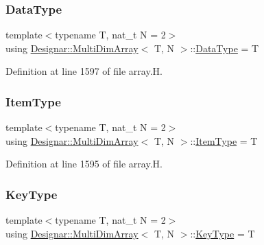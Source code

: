 \subsubsection{\texorpdfstring{Data\+Type}{DataType}}
{\footnotesize\ttfamily template$<$typename T, nat\+\_\+t N = 2$>$ \\
using \hyperlink{class_designar_1_1_multi_dim_array}{Designar\+::\+Multi\+Dim\+Array}$<$ T, N $>$\+::\hyperlink{class_designar_1_1_multi_dim_array_a23b3bec3a6a803d8ef7becceb592d6c0}{Data\+Type} =  T}



Definition at line 1597 of file array.\+H.

\mbox{\label{class_designar_1_1_multi_dim_array_a1b4c346c7e11cbada54447843d0c7880}} 
\subsubsection{\texorpdfstring{Item\+Type}{ItemType}}
{\footnotesize\ttfamily template$<$typename T, nat\+\_\+t N = 2$>$ \\
using \hyperlink{class_designar_1_1_multi_dim_array}{Designar\+::\+Multi\+Dim\+Array}$<$ T, N $>$\+::\hyperlink{class_designar_1_1_multi_dim_array_a1b4c346c7e11cbada54447843d0c7880}{Item\+Type} =  T}



Definition at line 1595 of file array.\+H.

\mbox{\label{class_designar_1_1_multi_dim_array_aa8c6b455e3cd5b74a57243a13553c6ff}} 
\subsubsection{\texorpdfstring{Key\+Type}{KeyType}}
{\footnotesize\ttfamily template$<$typename T, nat\+\_\+t N = 2$>$ \\
using \hyperlink{class_designar_1_1_multi_dim_array}{Designar\+::\+Multi\+Dim\+Array}$<$ T, N $>$\+::\hyperlink{class_designar_1_1_multi_dim_array_aa8c6b455e3cd5b74a57243a13553c6ff}{Key\+Type} =  T}



